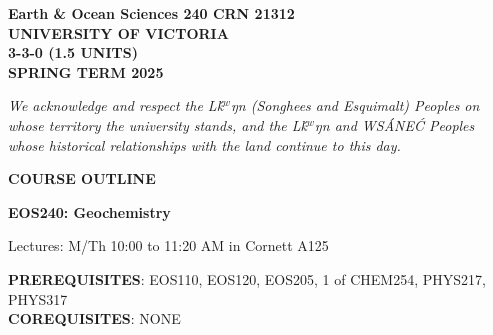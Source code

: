 \documentclass[11pt]{article}
\def\schwa{{\tenipa\char64}}
\begin{document}

%


\hspace*{\fill}\textbf{Earth \& Ocean Sciences 240 CRN 21312}\\
\hspace*{\fill}\textbf{UNIVERSITY OF VICTORIA}\\
\hspace*{\fill}\textbf{3-3-0 (1.5 UNITS)}\\
\hspace*{\fill}\textbf{SPRING TERM 2025}\\


\noindent\hrulefill

\begin{center}
\emph{We acknowledge and respect the L\schwa\'k$^w$\schwa ŋ\schwa n (Songhees and Esquimalt) Peoples on whose territory the university stands, and the L\schwa\'k$^w$\schwa ŋ\schwa n and WS\'ANE\'C Peoples whose historical relationships with the land continue to this day.}
\end{center}

\noindent\hrulefill

\begin{center}
\Large \textbf{COURSE OUTLINE}

\Large \textbf{EOS240: Geochemistry}

\normalsize Lectures: M/Th 10:00 to 11:20 AM in Cornett A125  \\
\end{center}

\noindent\hrulefill

\textbf{PREREQUISITES}: EOS110, EOS120, EOS205, 1 of CHEM254, PHYS217, PHYS317\\
\textbf{COREQUISITES}: NONE\\
\end{document}
